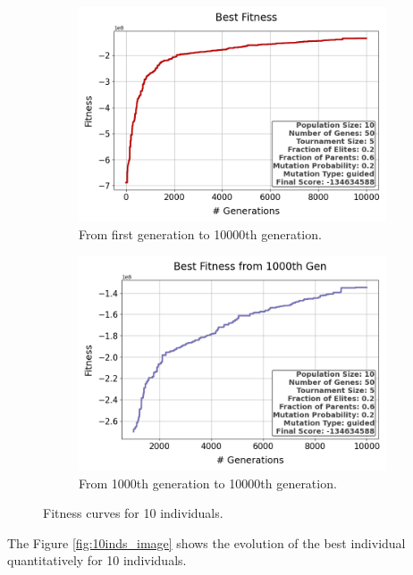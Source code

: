 \documentclass{assignment}
\begin{document}
\begin{figure}[h!]
    \begin{subfigure}{0.5\textwidth}
        \includegraphics[width=\textwidth]{figures/best_fitness_output_10_50_5_0.2_0.6_0.2_guided.png}
        \caption{From first generation to 10000th generation.}
    \end{subfigure}\hfill
    \begin{subfigure}{0.5\textwidth}
        \includegraphics[width=\textwidth]{figures/best_fitness_1000_output_10_50_5_0.2_0.6_0.2_guided.png}
        \caption{From 1000th generation to 10000th generation.}
    \end{subfigure}
    \caption{Fitness curves for 10 individuals.}
\label{fig:10inds}
\end{figure}

The Figure \ref{fig:10inds_image} shows the evolution of the best individual quantitatively for 10 individuals.
\end{document}
